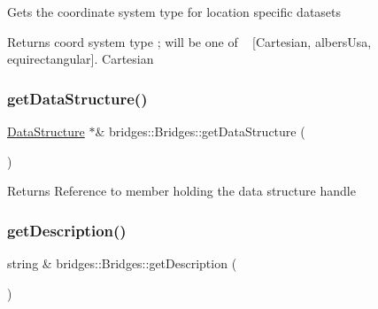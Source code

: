 Gets the coordinate system type for location specific datasets

\begin{DoxyReturn}{Returns}
coord system type ; will be one of ~\newline
\mbox{[}\textquotesingle{}Cartesian\textquotesingle{}, \textquotesingle{}albers\+Usa\textquotesingle{}, \textquotesingle{}equirectangular\textquotesingle{}\mbox{]}. \textquotesingle{}Cartesian\textquotesingle{} 
\end{DoxyReturn}
\mbox{\label{namespacebridges_1_1_bridges_a7cee9c57a0cd6a213722ba0a81a742f0}} 
\subsubsection{\texorpdfstring{get\+Data\+Structure()}{getDataStructure()}}
{\footnotesize\ttfamily \mbox{\hyperlink{classbridges_1_1_data_structure}{Data\+Structure}} $\ast$\& bridges\+::\+Bridges\+::get\+Data\+Structure (\begin{DoxyParamCaption}{ }\end{DoxyParamCaption})}

\begin{DoxyReturn}{Returns}
Reference to member holding the data structure handle 
\end{DoxyReturn}
\mbox{\label{namespacebridges_1_1_bridges_a11570abeb2d710440c709bafca816a64}} 
\subsubsection{\texorpdfstring{get\+Description()}{getDescription()}}
{\footnotesize\ttfamily string \& bridges\+::\+Bridges\+::get\+Description (\begin{DoxyParamCaption}{ }\end{DoxyParamCaption})}

\mbox{\label{namespacebridges_1_1_bridges_a6a7303bf89edfe41c19f30b4cc6430b9}} 
